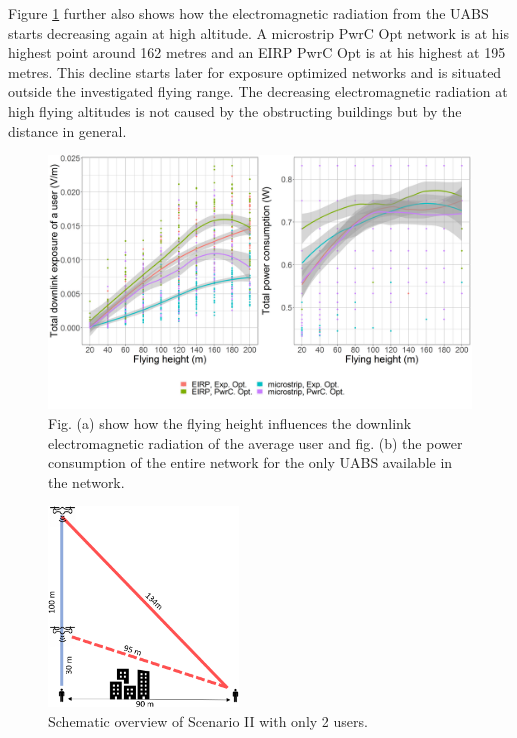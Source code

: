 Figure \ref{fig:s2a_dlAndPc} further also shows how the electromagnetic radiation from the \gls{UABS}
starts  decreasing again at high altitude. A microstrip \gls{PwrC Opt} network is at his highest point  
around 162 metres and an \gls{EIRP} \gls{PwrC Opt} is at his highest at 195 metres.
This decline starts later for exposure optimized networks and is situated outside the investigated flying range.
The decreasing electromagnetic radiation at high flying altitudes is not caused by the obstructing buildings but by the 
distance in general.


\begin{figure}[h!]
  \includegraphics[width=\textwidth]{../results/s2/fhvsdlAndPc.png}
  \caption{Fig. (a) show how the flying height influences the downlink electromagnetic radiation of the average user and fig. (b) the
  power consumption of the entire network for the only \acs{UABS} available in the network.}
  \label{fig:s2a_dlAndPc}
\end{figure}

\FloatBarrier
\begin{figure}
\vspace{-0.7cm}
  \begin{center}
    \includegraphics[width=0.45\textwidth]{../results/s2/proveScenario.png}
  \end{center}
  \caption{Schematic overview of Scenario II with only 2 users.}
  \label{fig:schematicprove}
\end{figure}

